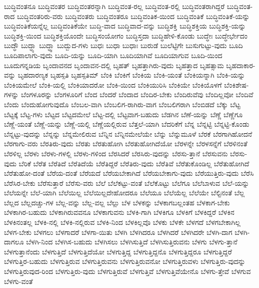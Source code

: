 {ಬುದ್ಧಿವಂತನೂ
ಬುದ್ಧಿವಂತರ
ಬುದ್ಧಿವಂತರನ್ನಾಗಿ
ಬುದ್ಧಿವಂತ-ರಲ್ಲ
ಬುದ್ಧಿವಂತ-ರಲ್ಲಿ
ಬುದ್ಧಿವಂತರಾಗಿದ್ದರೆ
ಬುದ್ಧಿವಂತ-ರಾದ
ಬುದ್ಧಿವಂತರಿರು-ವರು
ಬುದ್ಧಿವಂತರು
ಬುದ್ಧಿವಂತರೂ
ಬುದ್ಧಿವಂತಿಕ-ಯಿಂದ
ಬುದ್ಧಿವಂತಿಕೆ
ಬುದ್ಧಿವಂತಿಕೆ-ಯನ್ನು
ಬುದ್ಧಿವಂತಿಕೆಯನ್ನೆಲ್ಲ
ಬುದ್ಧಿವಂತಿಕೆಯೇ
ಬುದ್ಧಿ-ವಾದ
ಬುದ್ಧಿವಾದ-ವನ್ನು
ಬುದ್ಧಿಶಕ್ತಿ
ಬುದ್ಧಿಶಕ್ತಿಯ
ಬುದ್ಧಿಶಕ್ತಿ-ಯನ್ನು
ಬುದ್ಧಿಶಕ್ತಿ-ಯಿಂದ
ಬುದ್ಧಿಶಕ್ತಿಯೊಂದೇ
ಬುದ್ಧಿಸಂಯೋಗಂ
ಬುದ್ಧಿಸ್ತದಾ
ಬುದ್ಧಿಹೇಳಿ-ಕೊಂಡು
ಬುದ್ಧೇಃ
ಬುದ್ಧೇರ್ಭೇದಂ
ಬುದ್ಧೌ
ಬುದ್ಧ್ಯಾ
ಬುದ್ಧ್ವಾ
ಬುದ್ಬುದ-ಗಳು
ಬುಧಃ
ಬುಧಾ
ಬುಧಾಃ
ಬುರುಡೆ
ಬುಲೆಟ್ಟಿಗೇ
ಬುಸುಗುಟ್ಟು-ವುದು
ಬೂದಿ
ಬೂದಿಪಾಲಾಗು-ವುದು
ಬೂದಿ-ಯನ್ನು
ಬೂದಿ-ಯಾಗಿ
ಬೂದಿಯಾಗಿವೆ
ಬೂದಿಯಾಗುವ
ಬೂದಿ-ಯಿಂದ
ಬೂದುಗನ್ನಡಿಯ
ಬೃಂದಾವನದ
ಬೃಂದಾವನ-ದಲ್ಲಿ
ಬೃಹತ್
ಬೃಹತ್ತಾಗಿರು-ವುದು
ಬೃಹತ್ತಾದ
ಬೃಹತ್ಸಾಮ
ಬೃಹದಾಕಾರ-ವನ್ನು
ಬೃಹದಾರಣ್ಯಕ
ಬೃಹಸ್ಪತಿ
ಬೃಹಸ್ಪತಿಮ್
ಬೆಂಕಿ
ಬೆಂಕಿಗೆ
ಬೆಂಕಿಯ
ಬೆಂಕಿ-ಯಂತೆ
ಬೆಂಕಿಯನ್ನಾಗಿ
ಬೆಂಕಿ-ಯನ್ನು
ಬೆಂಕಿಯಮೇಲೆ
ಬೆಂಕಿ-ಯಲ್ಲಿ
ಬೆಂಕಿಯಾದರೋ
ಬೆಂಕಿ-ಯಿಂದ
ಬೆಂಕಿಯುರಿಸಿ
ಬೆಂಕಿಯೇ
ಬೆಂಕಿಯೊಳಗೆ
ಬೆಂಕಿಶೇಷ-ಗಳನ್ನು
ಬೆಂಗಳೂರನ್ನು
ಬೆಂಗಳೂರಿಗೆ
ಬೆಂದ
ಬೆಂದರೆ
ಬೆಂದಾದ
ಬೆಂದಿರ-ಬೇಕು
ಬೆಂದಿರುವೆವು
ಬೆಂದಿಲ್ಲವೋ
ಬೆಂದಿವೆ
ಬೆಂದು
ಬೆಂದುಹೋಗುವುದೊ
ಬೆಂಬಲ-ವಾಗಿ
ಬೆಂಬಲಿಗ-ರಾಗಿರು-ವಾಗ
ಬೆಂಬಲಿಗರಾಗಿ
ಬೆಂಬಿಡದೆ
ಬೆಕ್ಕು
ಬೆಟ್ಟ
ಬೆಟ್ಟಕ್ಕೆ
ಬೆಟ್ಟ-ಗಳು
ಬೆಟ್ಟದ
ಬೆಟ್ಟದಮೇಲೆ
ಬೆಟ್ಟ-ದಲ್ಲಿ
ಬೆಟ್ಟವಾಗ-ಬಹುದು
ಬೆಡಗಿನ
ಬೆಣೆ-ಯನ್ನು
ಬೆಣ್ಣೆ
ಬೆಣ್ಣೆಗೂ
ಬೆಣ್ಣೆ-ಯಂತೆ
ಬೆಣ್ಣೆ-ಯನ್ನು
ಬೆಣ್ಣೆ-ಯಲ್ಲಿ
ಬೆಣ್ಣೆಯಲ್ಲಿರುವ
ಬೆತ್ತಲೆ-ಯಾಗಿ
ಬೆದರಿಕೆಗೆ
ಬೆನ್ನ
ಬೆನ್ನಟ್ಟಿ
ಬೆನ್ನಟ್ಟಿ-ಕೊಂಡು
ಬೆನ್ನಟ್ಟು-ವುದನ್ನು
ಬೆನ್ನನ್ನು
ಬೆನ್ನಮೇಲಿರುವ
ಬೆನ್ನಿನ
ಬೆನ್ನಿನಮೇಲೆಯೇ
ಬೆನ್ನು
ಬೆನ್ನುಮೂಳೆ
ಬೆರಕೆ
ಬೆರಗಾಗಿಹೋದನೆ
ಬೆರಗಾಗು-ವರು
ಬೆರತಿರು-ವುದು
ಬೆರತು
ಬೆರತುಹೋಗಿ
ಬೆರತುಹೋಗಿದೆಯೋ
ಬೆರಳನ್ನೇ
ಬೆರಳಸನ್ನೆಗೆ
ಬೆರಳಿನಂತೆ
ಬೆರಳಿಲ್ಲ
ಬೆರಳು
ಬೆರಳು-ಗಳಲ್ಲಿ
ಬೆರಳು-ಗಳಿಂದ
ಬೆರಸಿದರೆ
ಬೆರಸಿರು-ವುದನ್ನು
ಬೆರಸು-ತ್ತಾನೆ
ಬೆರಸುವನು
ಬೆರಸು-ವುದು
ಬೆರಿಕೆ
ಬೆರೆತ
ಬೆರೆತಿದೆ
ಬೆರೆತಿದೆಯೆ
ಬೆರೆತಿದ್ದರೆ
ಬೆರೆತಿರು-ವುದು
ಬೆರೆತಿವೆ
ಬೆರೆತುಕೊಂಡಿಲ್ಲ
ಬೆರೆತುಹೋಗಿದೆ
ಬೆರೆತುಹೋ-ದಂತೆ
ಬೆರೆಯ-ದಂತೆ
ಬೆರೆಯದೆ
ಬೆರೆಯಬೇಕಾಗಿದೆ
ಬೆರೆಯಬೇಕಾಗು-ವುದು
ಬೆರೆಯುತ್ತಿರು-ವುದು
ಬೆರೆಸಿ
ಬೆರೆಸಿರ-ಬೇಕು
ಬೆರೆಸುತ್ತಾರೆ
ಬೆರೆಸು-ವರು
ಬೆಲೆ
ಬೆಲೆಕಟ್ಟು-ವಂತೆ
ಬೆಲೆಕೊಟ್ಟು
ಬೆಲೆಗೂ
ಬೆಲೆಬಾಳುವ
ಬೆಲೆ-ಯನ್ನು
ಬೆಲೆಯನ್ನೇ
ಬೆಲೆ-ಯಾಗಿ
ಬೆಲೆಯಿಲ್ಲ
ಬೆಲೆಯಿಲ್ಲದೇಹೋದರೂ
ಬೆಲೆಯೂ
ಬೆಲೆಯೆಲ್ಲ
ಬೆಲೆಯೇ
ಬೆಲ್ಟಿನಂತೆ
ಬೆಲ್ಲ
ಬೆಲ್ಲದ
ಬೆಲ್ಲದಚ್ಚು-ಗಳ
ಬೆಲ್ಲ-ವನ್ನು
ಬೆಲ್ಲ-ವಲ್ಲ
ಬೆಲ್ಲು
ಬೆಳ
ಬೆಳಕನ್ನು
ಬೆಳಕಾಗಬಲ್ಲಂತಹ
ಬೆಳಕಾಗ-ಬೇಕು
ಬೆಳಕಾಗಿರ-ಬಹುದು
ಬೆಳಕಾಗಿರುವವನೂ
ಬೆಳಕಾಗುವನು
ಬೆಳಕಿ-ಗಾಗಿ
ಬೆಳಕಿಗೂ
ಬೆಳಕಿಗೆ
ಬೆಳಕಿದ್ದರೆ
ಬೆಳಕಿನ
ಬೆಳಕಿನಂತಲ್ಲ
ಬೆಳಕಿ-ನಲ್ಲಿ
ಬೆಳಕಿ-ನಲ್ಲಿರುವ
ಬೆಳಕಿ-ನಿಂದ
ಬೆಳಕಿಲ್ಲವೊ
ಬೆಳಕು
ಬೆಳಕೇ
ಬೆಳಗದೆ
ಬೆಳಗಬೇಕಾಗಿಲ್ಲ
ಬೆಳಗ-ಬೇಕು
ಬೆಳಗಲು
ಬೆಳಗಾದರೆ
ಬೆಳಗಾ-ಯಿತು
ಬೆಳಗಿ
ಬೆಳಗಿದರೂ
ಬೆಳಗಿದರೆ
ಬೆಳಗಿದರೇ
ಬೆಳಗಿ-ದಾಗ
ಬೆಳಗಿ-ದಾಗಲೂ
ಬೆಳಗಿ-ನಿಂದ
ಬೆಳಗಿಸ-ಬಹುದು
ಬೆಳಗಿಸಲು
ಬೆಳಗಿಸುತ್ತಿದೆ
ಬೆಳಗಿಸುತ್ತಿರುವನು
ಬೆಳಗು
ಬೆಳಗು-ತ್ತಾನೆ
ಬೆಳಗುತ್ತಾನೆಂದು
ಬೆಳಗುತ್ತಿದೆ
ಬೆಳಗುತ್ತಿದೆಯೋ
ಬೆಳಗುತ್ತಿದ್ದ
ಬೆಳಗುತ್ತಿದ್ದನೊ
ಬೆಳಗುತ್ತಿದ್ದರೂ
ಬೆಳಗುತ್ತಿದ್ದರೆ
ಬೆಳಗುತ್ತಿರ-ಬಹುದು
ಬೆಳಗುತ್ತಿರುವ
ಬೆಳಗುತ್ತಿರುವನು
ಬೆಳಗುತ್ತಿರುವನೋ
ಬೆಳಗುತ್ತಿರುವಳು
ಬೆಳಗುತ್ತಿರು-ವುದನ್ನು
ಬೆಳಗುತ್ತಿರುವುದ-ರಿಂದ
ಬೆಳಗುತ್ತಿರು-ವುದು
ಬೆಳಗುತ್ತಿರುವೆ
ಬೆಳಗುತ್ತಿವೆ
ಬೆಳಗುತ್ತಿವೆಯೇನೊ
ಬೆಳಗು-ತ್ತೇವೆ
ಬೆಳಗುವ
ಬೆಳಗು-ವಂತೆ
}
